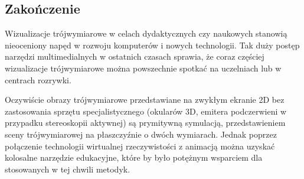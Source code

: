 \subsection{Zakończenie}
Wizualizacje trójwymiarowe w celach dydaktycznych czy naukowych stanowią nieoceniony napęd w rozwoju komputerów i nowych technologii.   Tak duży postęp narzędzi multimedialnych w ostatnich czasach sprawia, że coraz częściej wizualizacje trójwymiarowe można powszechnie spotkać na uczelniach lub w centrach rozrywki.

Oczywiście obrazy trójwymiarowe przedstawiane na zwykłym ekranie 2D bez zastosowania sprzętu specjalistycznego (okularów 3D, emitera podczerwieni w przypadku stereoskopii aktywnej) są prymitywną symulacją, przedstawieniem sceny trójwymiarowej na płaszczyźnie o dwóch wymiarach. Jednak poprzez połączenie technologii wirtualnej rzeczywistości z animacją można uzyskać kolosalne narzędzie edukacyjne, które by było potężnym wsparciem dla stosowanych w tej chwili metodyk. 

